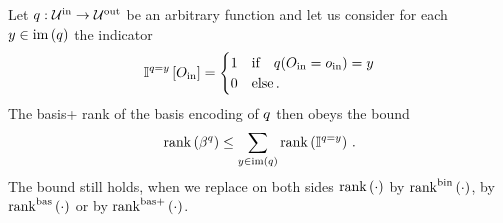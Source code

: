 \begin{theorem}
    Let $q : \mathcal{U}^{\mathrm{in}} \rightarrow \mathcal{U}^{\mathrm{out}}$ be an arbitrary function and let us consider for each $y\in\mathrm{im}\left(q\right)$ the indicator
    \begin{align*}
        \mathbb{I}^{q=y}\left[O_{\mathrm{in}}\right] =
        \begin{cases}
            1 & \text{if}\quad q(O_{\mathrm{in}}=o_{\mathrm{in}})=y \\
            0 & \text{else} \, .
        \end{cases}
    \end{align*}
    The basis+ rank of the basis encoding of $q$ then obeys the bound
    \begin{align*}
        \mathrm{rank}\left(\beta^{q}\right) \leq \sum_{y\in\mathrm{im}\left(q\right)} \mathrm{rank}\left(\mathbb{I}^{q=y} \right) \, .
    \end{align*}
    The bound still holds, when we replace on both sides $\mathrm{rank}\left(\cdot\right)$ by $\mathrm{rank}^{\mathrm{bin}}\left(\cdot\right)$, by $\mathrm{rank}^{\mathrm{bas}}\left(\cdot\right)$ or by $\mathrm{rank}^{\mathrm{bas+}}\left(\cdot\right)$.
\end{theorem}
